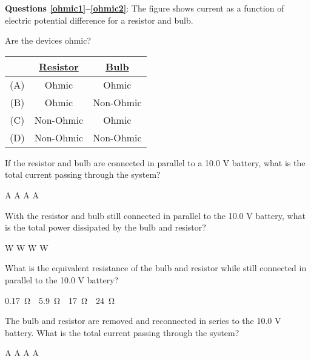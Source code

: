 \documentclass{../../oss-apphys-exam}
\begin{document}


\classkickMCinstructions

\textbf{Questions \ref{ohmic1}--\ref{ohmic2}}: The figure shows current as a
function of electric potential difference for a resistor and bulb.

\begin{questions}
  \question Are the devices ohmic?
  \label{ohmic1}
  
  \begin{tabular}{ccc}
    & \underline{Resistor} & \underline{Bulb}\\ \hline
    (A) & Ohmic & Ohmic \\
    (B) & Ohmic & Non-Ohmic\\
    (C) & Non-Ohmic & Ohmic\\
    (D) & Non-Ohmic & Non-Ohmic\\
  \end{tabular}
  
  \question If the resistor and bulb are connected in parallel to a 10.0 V
  battery, what is the total current passing through the system?
  \begin{choices}
     A
     A
     A
     A
  \end{choices}

  \question With the resistor and bulb still connected in parallel to the 10.0 V
  battery, what is the total power dissipated by the bulb and resistor?
  \begin{choices}
     W
     W
     W
     W
  \end{choices}
  
  \question What is the equivalent resistance of the bulb and resistor while
  still connected in parallel to the 10.0 V battery?
  \begin{choices}
    \choice\SI{.17}\ohm
    \choice\SI{5.9}\ohm
    \choice\SI{17}\ohm
    \choice\SI{24}\ohm
  \end{choices}

  \question The bulb and resistor are removed and reconnected in series to the
  10.0 V battery. What is the total current passing through the system?
  \label{ohmic2}
  \begin{choices}
     A
     A
     A
     A
  \end{choices}
  \newpage
  

\end{questions}
\end{document}
